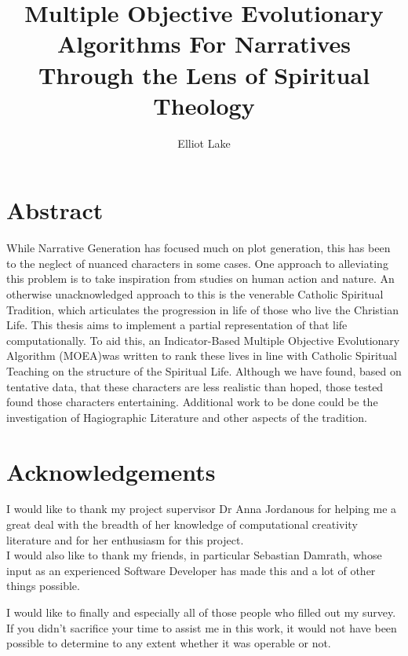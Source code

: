 \documentclass[12pt]{article}
\author{Elliot Lake}
\title{Multiple Objective Evolutionary Algorithms For Narratives Through the Lens of Spiritual Theology}
\begin{document}
\maketitle
\pagebreak 
\section{Abstract}
While Narrative Generation has focused much on plot generation, this has been to the neglect of nuanced characters in some cases. One approach to alleviating this problem is to take inspiration from studies on human action and nature. An otherwise unacknowledged approach to this is the venerable Catholic Spiritual Tradition, which articulates the progression in life of those who live the Christian Life. This thesis aims to implement a partial representation of that life computationally. To aid this, an Indicator-Based Multiple Objective Evolutionary Algorithm (MOEA)was written to rank these lives in line with Catholic Spiritual Teaching on the structure of the Spiritual Life. Although we have found, based on tentative data, that these characters are less realistic than hoped, those tested found those characters entertaining. Additional work to be done could be the investigation of Hagiographic Literature and other aspects of the tradition.
\section{Acknowledgements}

I would like to thank my project supervisor Dr Anna Jordanous for helping me a great deal with the breadth of her knowledge of computational creativity literature and for her enthusiasm for this project. \\

I would also like to thank my friends, in particular Sebastian Damrath, whose input as an experienced Software Developer has made this and a lot of other things possible.

I would like to finally and especially all of those people who filled out my survey. If you didn't sacrifice your time to assist me in this work, it would not have been possible to determine to any extent whether it was operable or not. 

\pagebreak
\tableofcontents
\end{document}
